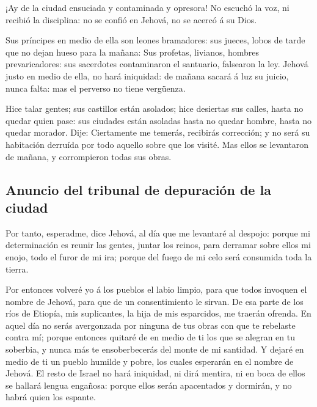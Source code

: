  ¡Ay de la ciudad ensuciada y contaminada y opresora!
 No escuchó la voz, ni recibió la disciplina: no se confió
en Jehová, no se acercó á su Dios.

 Sus príncipes en medio de ella son leones bramadores: sus
jueces, lobos de tarde que no dejan hueso para la mañana: 
Sus profetas, livianos, hombres prevaricadores: sus sacerdotes
contaminaron el santuario, falsearon la ley.  Jehová justo
en medio de ella, no hará iniquidad: de mañana sacará á luz su juicio,
nunca falta: mas el perverso no tiene vergüenza.

 Hice talar gentes; sus castillos están asolados; hice
desiertas sus calles, hasta no quedar quien pase: sus ciudades están
asoladas hasta no quedar hombre, hasta no quedar morador. 
Dije: Ciertamente me temerás, recibirás corrección; y no será su
habitación derruída por todo aquello sobre que los visité. Mas ellos se
levantaron de mañana, y corrompieron todas sus obras.

\hypertarget{anuncio-del-tribunal-de-depuraciuxf3n-de-la-ciudad}{%
\subsection{Anuncio del tribunal de depuración de la
ciudad}\label{anuncio-del-tribunal-de-depuraciuxf3n-de-la-ciudad}}

 Por tanto, esperadme, dice Jehová, al día que me
levantaré al despojo: porque mi determinación es reunir las gentes,
juntar los reinos, para derramar sobre ellos mi enojo, todo el furor de
mi ira; porque del fuego de mi celo será consumida toda la tierra.

 Por entonces volveré yo á los pueblos el labio limpio,
para que todos invoquen el nombre de Jehová, para que de un
consentimiento le sirvan.  De esa parte de los ríos de
Etiopía, mis suplicantes, la hija de mis esparcidos, me traerán ofrenda.
 En aquel día no serás avergonzada por ninguna de tus
obras con que te rebelaste contra mí; porque entonces quitaré de en
medio de ti los que se alegran en tu soberbia, y nunca más te
ensoberbecerás del monte de mi santidad.  Y dejaré en
medio de ti un pueblo humilde y pobre, los cuales esperarán en el nombre
de Jehová.  El resto de Israel no hará iniquidad, ni dirá
mentira, ni en boca de ellos se hallará lengua engañosa: porque ellos
serán apacentados y dormirán, y no habrá quien los espante.

